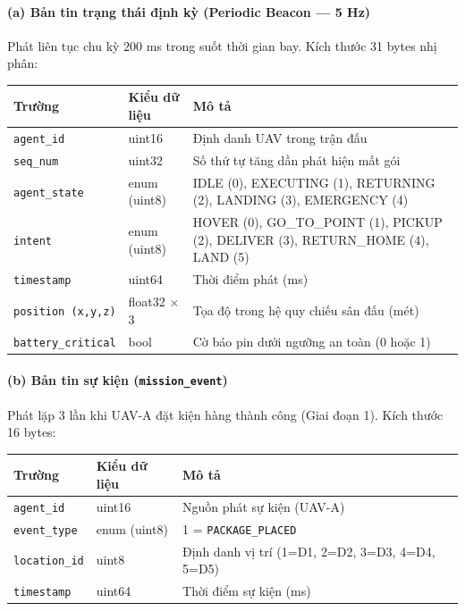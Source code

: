 \documentclass[12pt,a4paper]{article}
\begin{document}
\paragraph{(a) Bản tin trạng thái định kỳ (Periodic Beacon — 5 Hz)}
Phát liên tục chu kỳ $200$ ms trong suốt thời gian bay. Kích thước 31 bytes nhị phân:
\begin{center}
\begin{tabular}{p{3.2cm}p{3.0cm}p{7.5cm}}
\toprule
\textbf{Trường} & \textbf{Kiểu dữ liệu} & \textbf{Mô tả} \\
\midrule
\texttt{agent\_id} & uint16 & Định danh UAV trong trận đấu \\
\texttt{seq\_num} & uint32 & Số thứ tự tăng dần phát hiện mất gói \\
\texttt{agent\_state} & enum (uint8) & IDLE (0), EXECUTING (1), RETURNING (2), LANDING (3), EMERGENCY (4) \\
\texttt{intent} & enum (uint8) & HOVER (0), GO\_TO\_POINT (1), PICKUP (2), DELIVER (3), RETURN\_HOME (4), LAND (5) \\
\texttt{timestamp} & uint64 & Thời điểm phát (ms) \\
\texttt{position (x,y,z)} & float32 $\times$ 3 & Tọa độ trong hệ quy chiếu sân đấu (mét) \\
\texttt{battery\_critical} & bool & Cờ báo pin dưới ngưỡng an toàn (0 hoặc 1) \\
\bottomrule
\end{tabular}
\end{center}

\paragraph{(b) Bản tin sự kiện (\texttt{mission\_event})}
Phát lặp 3 lần khi UAV-A đặt kiện hàng thành công (Giai đoạn 1). Kích thước 16 bytes:
\begin{center}
\begin{tabular}{p{3.2cm}p{3.0cm}p{7.5cm}}
\toprule
\textbf{Trường} & \textbf{Kiểu dữ liệu} & \textbf{Mô tả} \\
\midrule
\texttt{agent\_id} & uint16 & Nguồn phát sự kiện (UAV-A) \\
\texttt{event\_type} & enum (uint8) & 1 = \texttt{PACKAGE\_PLACED} \\
\texttt{location\_id} & uint8 & Định danh vị trí (1=D1, 2=D2, 3=D3, 4=D4, 5=D5) \\
\texttt{timestamp} & uint64 & Thời điểm sự kiện (ms) \\
\bottomrule
\end{tabular}
\end{center}
\end{document}
